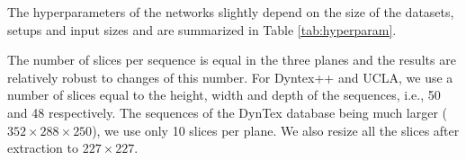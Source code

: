 \documentclass[a4paper,11pt]{article}
\begin{document}
The hyperparameters of the networks slightly depend on the size of the datasets, setups and input sizes and are summarized in Table \ref{tab:hyperparam}.
\begin{table*}[!t]
\caption{Hyperparameters used for training both T-CNNs based on AlexNet and GoogleNet on different datasets.
From left to right: initial learning rate, factor gamma by which the learning rate is multiplied at every step, weight decay, momentum, batch size, number of iterations and
steps} \label{tab:hyperparam}
\centering
{}
\end{table*}

The number of slices per sequence is equal in the three planes and the results are relatively robust to changes of this number.
For Dyntex++ and UCLA, we use a number of slices equal to the height, width and depth of the sequences, i.e., 50 and 48 respectively.
The sequences of the DynTex database being much larger ($352\times 288\times 250$), we use only 10 slices per plane.
We also resize all the slices after extraction to $227\times 227$.
\end{document}
